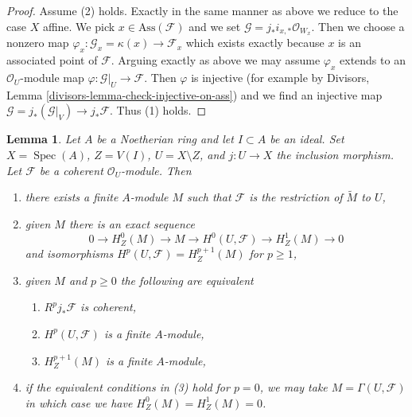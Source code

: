 \documentclass{stacks-project}
\theoremstyle{plain}
\newtheorem{lemma}[subsection]{Lemma}
\theoremstyle{definition}
\theoremstyle{remark}
\numberwithin{equation}{subsection}
\def\Spec{\mathop{\mathrm{Spec}}}
\begin{document}
\begin{proof}
\medskip\noindent
Assume (2) holds. Exactly in the same manner as above we reduce
to the case $X$ affine. We pick $x \in \text{Ass}(\mathcal{F})$
and we set $\mathcal{G} = j_*i_{x, *}\mathcal{O}_{W_x}$.
Then we choose a nonzero map
$\varphi_x : \mathcal{G}_x = \kappa(x) \to \mathcal{F}_x$
which exists exactly because $x$ is an associated point of $\mathcal{F}$.
Arguing exactly as above we may assume $\varphi_x$
extends to an $\mathcal{O}_U$-module map
$\varphi : \mathcal{G}|_U \to \mathcal{F}$.
Then $\varphi$ is injective (for example by
Divisors, Lemma \ref{divisors-lemma-check-injective-on-ass})
and we find an injective map
$\mathcal{G} = j_*(\mathcal{G}|_V) \to j_*\mathcal{F}$.
Thus (1) holds.
\end{proof}

\begin{lemma}
\label{lemma-finiteness-pushforwards-and-H1-local}
Let $A$ be a Noetherian ring and let $I \subset A$ be an ideal.
Set $X = \Spec(A)$, $Z = V(I)$, $U = X \setminus Z$, and $j : U \to X$
the inclusion morphism. Let $\mathcal{F}$ be a coherent $\mathcal{O}_U$-module.
Then
\begin{enumerate}
\item there exists a finite $A$-module $M$ such that $\mathcal{F}$ is the
restriction of $\widetilde{M}$ to $U$,
\item given $M$ there is an exact sequence
$$
0 \to H^0_Z(M) \to M \to H^0(U, \mathcal{F}) \to H^1_Z(M) \to 0
$$
and isomorphisms $H^p(U, \mathcal{F}) = H^{p + 1}_Z(M)$ for $p \geq 1$,
\item given $M$ and $p \geq 0$ the following are equivalent
\begin{enumerate}
\item $R^pj_*\mathcal{F}$ is coherent,
\item $H^p(U, \mathcal{F})$ is a finite $A$-module,
\item $H^{p + 1}_Z(M)$ is a finite $A$-module,
\end{enumerate}
\item if the equivalent conditions in (3) hold for $p = 0$, we may take
$M = \Gamma(U, \mathcal{F})$ in which case we have $H^0_Z(M) = H^1_Z(M) = 0$.
\end{enumerate}
\end{lemma}
\end{document}
